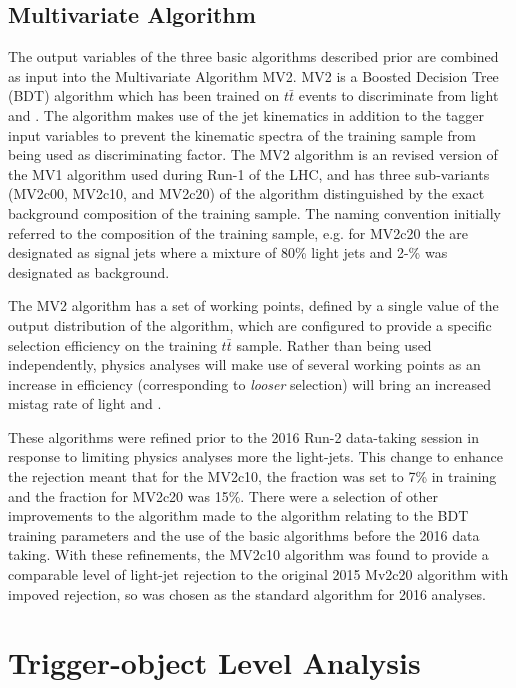 	\subsection{Multivariate Algorithm}
	\label{det:btag:mv}

	The output variables of the three basic algorithms described prior are combined as input into the Multivariate Algorithm MV2. MV2 is a Boosted Decision Tree (BDT) algorithm which has been trained on $t\bar{t}$ events to discriminate \bjets from light and \cjets. The algorithm makes use of the jet kinematics in addition to the tagger input variables to prevent the kinematic spectra of the training sample from being used as discriminating factor.  The MV2 algorithm is an revised version of the MV1 algorithm used during Run-1 of the LHC, and has three sub-variants (MV2c00, MV2c10, and MV2c20) of the algorithm distinguished by the exact background composition of the training sample. The naming convention initially referred to the \cjet composition of the training sample, e.g. for MV2c20 the \bjets are designated as signal jets where a mixture of 80\% light jets and 2-\% \cjets was designated as background.

	The MV2 algorithm has a set of working points, defined by a single value of the output distribution of the algorithm, which are configured to provide a specific \bjet selection efficiency on the training $t\bar{t}$ sample. Rather than being used independently, physics analyses will make use of several working points as an increase in \bjet efficiency (corresponding to \textit{looser} \bjet selection) will bring an increased mistag rate of light and \cjets.

	These algorithms were refined prior to the 2016 Run-2 data-taking session in response to \cjets limiting physics analyses more the light-jets. This change  to enhance the \cjet rejection meant that for the MV2c10, the \cjet fraction was set to 7\% in training and the fraction for MV2c20 was 15\%. There were a selection of other improvements to the algorithm made to the algorithm relating to the BDT training parameters and the use of the basic algorithms before the 2016 data taking. With these refinements, the MV2c10 algorithm was found to provide a comparable level of light-jet rejection to the original 2015 Mv2c20 algorithm with impoved \cjet rejection, so was chosen as the standard \btag algorithm for 2016 analyses. \cite{btagOptimisation}


\section{Trigger-object Level Analysis}

